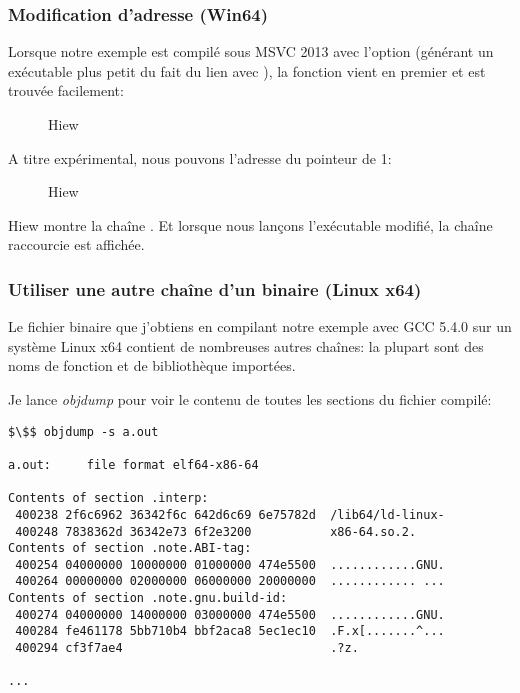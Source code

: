 ﻿\subsubsection{Modification d'adresse (Win64)}

Lorsque notre exemple est compilé sous MSVC 2013 avec l'option 
(générant un exécutable plus petit du fait du lien avec ), la fonction \main vient en premier et
est trouvée facilement:

\begin{figure}[H]
\centering
{}
\caption{Hiew}
\label{}
\end{figure}

A titre expérimental, nous pouvons  l'adresse du pointeur de 1:

\begin{figure}[H]
\centering
{}
\caption{Hiew}
\label{}
\end{figure}

Hiew montre la chaîne .
Et lorsque nous lançons l'exécutable modifié, la chaîne raccourcie est affichée.

\subsubsection{Utiliser une autre chaîne d'un binaire (Linux x64)}

Le fichier binaire que j'obtiens en compilant notre exemple avec GCC 5.4.0 sur un système Linux x64 contient de
nombreuses autres chaînes:
la plupart sont des noms de fonction et de bibliothèque importées.

Je lance \emph{objdump} pour voir le contenu de toutes les sections du fichier compilé:

\begin{lstlisting}[basicstyle=\ttfamily, mathescape]
$\$$ objdump -s a.out

a.out:     file format elf64-x86-64

Contents of section .interp:
 400238 2f6c6962 36342f6c 642d6c69 6e75782d  /lib64/ld-linux-
 400248 7838362d 36342e73 6f2e3200           x86-64.so.2.
Contents of section .note.ABI-tag:
 400254 04000000 10000000 01000000 474e5500  ............GNU.
 400264 00000000 02000000 06000000 20000000  ............ ...
Contents of section .note.gnu.build-id:
 400274 04000000 14000000 03000000 474e5500  ............GNU.
 400284 fe461178 5bb710b4 bbf2aca8 5ec1ec10  .F.x[.......^...
 400294 cf3f7ae4                             .?z.

...
\end{lstlisting}

